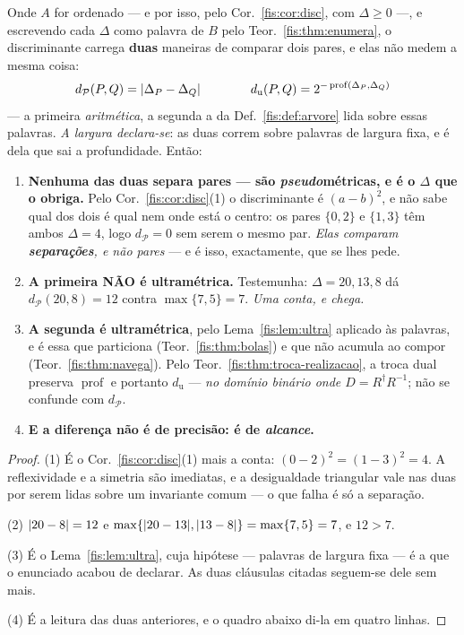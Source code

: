 \documentclass[livro.tex]{subfiles}
\begin{document}
\begin{corolario}\label{fis:cor:duasreguas}
Onde $A$ for ordenado --- e por isso, pelo Cor.~\ref{fis:cor:disc}, com
$\Delta\ge0$ ---, e escrevendo cada $\Delta$ como palavra de $B$ pelo
Teor.~\ref{fis:thm:enumera}, o discriminante carrega \textbf{duas} maneiras de
comparar dois pares, e elas não medem a mesma coisa:
\[
d_{\mathcal{P}}(P,Q)=\lvert \Delta_P-\Delta_Q\rvert
\qquad\qquad
d_{\mathrm{u}}(P,Q)=2^{-\operatorname{prof}(\Delta_P,\Delta_Q)}
\]
--- a primeira \emph{aritmética}, a segunda a da Def.~\ref{fis:def:arvore} lida
sobre essas palavras. \emph{A largura declara-se}: as duas correm sobre palavras
de largura fixa, e é dela que sai a profundidade. Então:
\begin{enumerate}\itemsep3pt
\item[(1)] \textbf{Nenhuma das duas separa pares --- são \emph{pseudo}métricas,
e é o $\Delta$ que o obriga.} Pelo Cor.~\ref{fis:cor:disc}(1) o discriminante é
$(a-b)^{2}$, e não sabe qual dos dois é qual nem onde está o centro: os pares
$\{0,2\}$ e $\{1,3\}$ têm ambos $\Delta=4$, logo $d_{\mathcal{P}}=0$ sem serem o
mesmo par. \emph{Elas comparam \textbf{separações}, e não pares} --- e é isso,
exactamente, que se lhes pede.
\item[(2)] \textbf{A primeira NÃO é ultramétrica.} Testemunha:
$\Delta=20,13,8$ dá $d_{\mathcal{P}}(20,8)=12$ contra
$\max\{7,5\}=7$. \emph{Uma conta, e chega.}
\item[(3)] \textbf{A segunda é ultramétrica}, pelo Lema~\ref{fis:lem:ultra}
aplicado às palavras, e é essa que particiona (Teor.~\ref{fis:thm:bolas}) e que
não acumula ao compor (Teor.~\ref{fis:thm:navega}). Pelo
Teor.~\ref{fis:thm:troca-realizacao}, a troca dual preserva
$\operatorname{prof}$ e portanto $d_{\mathrm u}$ --- \emph{no domínio binário
onde $D=R^{\dagger}R^{-1}$}; não se confunde com $d_{\mathcal P}$.
\item[(4)] \textbf{E a diferença não é de precisão: é de \emph{alcance}.}
\end{enumerate}
\end{corolario}

\begin{proof}
(1) É o Cor.~\ref{fis:cor:disc}(1) mais a conta: $(0-2)^{2}=(1-3)^{2}=4$. A
reflexividade e a simetria são imediatas, e a desigualdade triangular vale nas
duas por serem lidas sobre um invariante comum --- o que falha é só a separação.

(2) $\lvert 20-8\rvert=12$ e $\max\{\lvert 20-13\rvert,\lvert 13-8\rvert\}=\max\{7,5\}=7$, e $12>7$.

(3) É o Lema~\ref{fis:lem:ultra}, cuja hipótese --- palavras de largura fixa ---
é a que o enunciado acabou de declarar. As duas cláusulas citadas seguem-se dele
sem mais.

(4) É a leitura das duas anteriores, e o quadro abaixo di-la em quatro linhas.
\end{proof}
\end{document}

